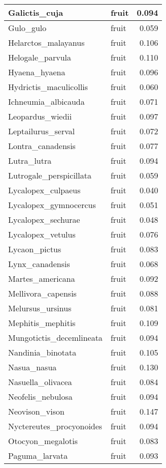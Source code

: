 \begin{table}
\begin{tabular}[t]{l|l|r}
\hline
Galictis\_cuja & fruit & 0.094\\
\hline
Gulo\_gulo & fruit & 0.059\\
\hline
Helarctos\_malayanus & fruit & 0.106\\
\hline
Helogale\_parvula & fruit & 0.110\\
\hline
Hyaena\_hyaena & fruit & 0.096\\
\hline
Hydrictis\_maculicollis & fruit & 0.060\\
\hline
Ichneumia\_albicauda & fruit & 0.071\\
\hline
Leopardus\_wiedii & fruit & 0.097\\
\hline
Leptailurus\_serval & fruit & 0.072\\
\hline
Lontra\_canadensis & fruit & 0.077\\
\hline
Lutra\_lutra & fruit & 0.094\\
\hline
Lutrogale\_perspicillata & fruit & 0.059\\
\hline
Lycalopex\_culpaeus & fruit & 0.040\\
\hline
Lycalopex\_gymnocercus & fruit & 0.051\\
\hline
Lycalopex\_sechurae & fruit & 0.048\\
\hline
Lycalopex\_vetulus & fruit & 0.076\\
\hline
Lycaon\_pictus & fruit & 0.083\\
\hline
Lynx\_canadensis & fruit & 0.068\\
\hline
Martes\_americana & fruit & 0.092\\
\hline
Mellivora\_capensis & fruit & 0.088\\
\hline
Melursus\_ursinus & fruit & 0.081\\
\hline
Mephitis\_mephitis & fruit & 0.109\\
\hline
Mungotictis\_decemlineata & fruit & 0.094\\
\hline
Nandinia\_binotata & fruit & 0.105\\
\hline
Nasua\_nasua & fruit & 0.130\\
\hline
Nasuella\_olivacea & fruit & 0.084\\
\hline
Neofelis\_nebulosa & fruit & 0.094\\
\hline
Neovison\_vison & fruit & 0.147\\
\hline
Nyctereutes\_procyonoides & fruit & 0.094\\
\hline
Otocyon\_megalotis & fruit & 0.083\\
\hline
Paguma\_larvata & fruit & 0.093\\
\hline

\end{tabular}
\end{table}
